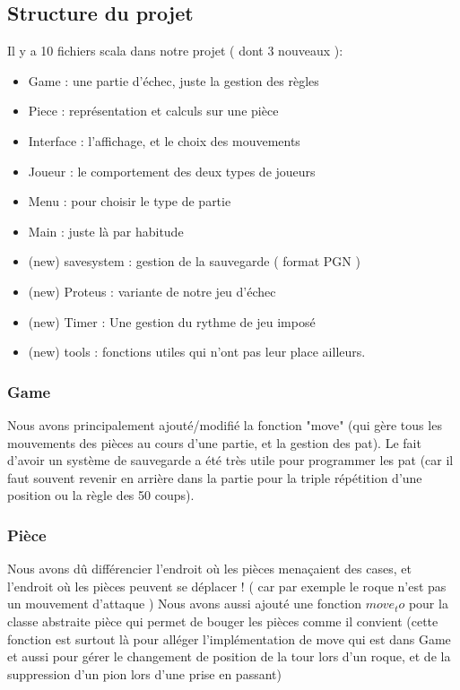 \documentclass{article}
\begin{document}
\subsection{Structure du projet}

Il y a 10 fichiers scala dans notre projet ( dont 3 nouveaux ):
\begin{itemize}
    \item Game : une partie d'échec, juste la gestion des règles
    \item Piece : représentation et calculs sur une pièce
    \item Interface : l'affichage, et le choix des mouvements
    \item Joueur : le comportement des deux types de joueurs
    \item Menu : pour choisir le type de partie
    \item Main : juste là par habitude
    \item (new) savesystem : gestion de la sauvegarde ( format PGN )
    \item (new) Proteus : variante de notre jeu d'échec
    \item (new) Timer : Une gestion du rythme de jeu imposé
    \item (new) tools : fonctions utiles qui n'ont pas leur place ailleurs.
\end{itemize}

\subsubsection{Game}
Nous avons principalement ajouté/modifié la fonction "move" (qui gère tous les mouvements des pièces au cours d'une partie, et la gestion des pat). Le fait d'avoir un système de sauvegarde a été très utile pour programmer les pat (car il faut souvent revenir en arrière dans la partie pour la triple répétition d'une position ou la règle des 50 coups).

\subsubsection{Pièce}
Nous avons dû différencier l'endroit où les pièces menaçaient des cases, et l'endroit où les pièces peuvent se déplacer ! ( car par exemple le roque n'est pas un mouvement d'attaque )
Nous avons aussi ajouté une fonction $move_to$ pour la classe abstraite pièce qui permet de bouger les pièces comme il convient (cette fonction est surtout là pour alléger l'implémentation de move qui est dans Game et aussi pour gérer le changement de position de la tour lors d'un roque, et de la suppression d'un pion lors d'une prise en passant)
\end{document}
